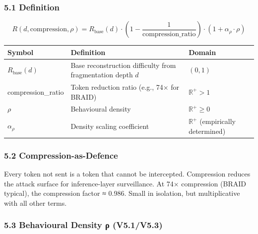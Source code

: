 \documentclass[
]{article}
\newcounter{none} %
\begin{document}
\subsubsection{5.1 Definition}\label{definition-2}

\[R(d, \text{compression}, \rho) = R_{\text{base}}(d) \cdot \left(1 - \frac{1}{\text{compression\_ratio}}\right) \cdot (1 + \alpha_\rho \cdot \rho)\]

{\def\LTcaptype{none} %
\begin{longtable}[]{@{}
  >{\raggedright\arraybackslash}p{}
  >{\raggedright\arraybackslash}p{}
  >{\raggedright\arraybackslash}p{}@{}}
\toprule\noalign{}
\begin{minipage}[b]{\linewidth}\raggedright
Symbol
\end{minipage} & \begin{minipage}[b]{\linewidth}\raggedright
Definition
\end{minipage} & \begin{minipage}[b]{\linewidth}\raggedright
Domain
\end{minipage} \\
\midrule\noalign{}
\endhead
\bottomrule\noalign{}
\endlastfoot
\(R_{\text{base}}(d)\) & Base reconstruction difficulty from
fragmentation depth \(d\) & \((0, 1)\) \\
compression\_ratio & Token reduction ratio (e.g., 74× for BRAID) &
\(\mathbb{R}^+ > 1\) \\
\(\rho\) & Behavioural density & \(\mathbb{R}^+ \geq 0\) \\
\(\alpha_\rho\) & Density scaling coefficient & \(\mathbb{R}^+\)
(empirically determined) \\
\end{longtable}
}

\subsubsection{5.2 Compression-as-Defence}\label{compression-as-defence}

Every token not sent is a token that cannot be intercepted. Compression
reduces the attack surface for inference-layer surveillance. At 74×
compression (BRAID typical), the compression factor ≈ 0.986. Small in
isolation, but multiplicative with all other terms.

\subsubsection{5.3 Behavioural Density ρ
(V5.1/V5.3)}\label{behavioural-density-ux3c1-v5.1v5.3}
\end{document}
